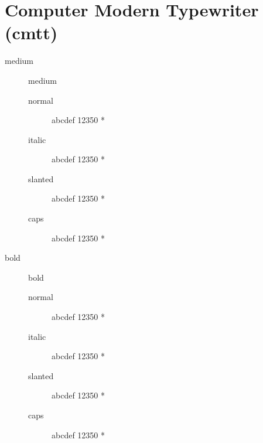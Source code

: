 \documentclass[12pt,a4paper]{report}
\begin{document}
    \section{Computer Modern Typewriter (cmtt)}
    \begin{description}
        \item [medium] medium
        \begin{description}
            \item [normal]  abcdef 12350 *
            \item [italic]  abcdef 12350 *
            \item [slanted]  abcdef 12350 *
            \item [caps]  abcdef 12350 *
        \end{description}
        
        \item [bold] bold
        \begin{description}
            \item [normal]  abcdef 12350 *
            \item [italic]  abcdef 12350 *
            \item [slanted]  abcdef 12350 *
            \item [caps]  abcdef 12350 *
        \end{description}
        

\end{description}
\end{document}
